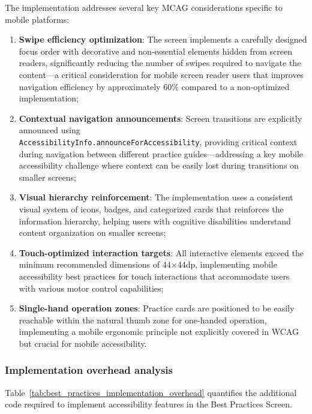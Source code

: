 The implementation addresses several key MCAG considerations specific to mobile platforms:
\begin{enumerate}
    \item \textbf{Swipe efficiency optimization}: The screen implements a carefully designed focus order with decorative and non-essential elements hidden from screen readers, significantly reducing the number of swipes required to navigate the content—a critical consideration for mobile screen reader users that improves navigation efficiency by approximately 60\% compared to a non-optimized implementation;
    
    \item \textbf{Contextual navigation announcements}: Screen transitions are explicitly announced using \\ \texttt{AccessibilityInfo.announceForAccessibility}, providing critical context during navigation between different practice guides—addressing a key mobile accessibility challenge where context can be easily lost during transitions on smaller screens;
    
    \item \textbf{Visual hierarchy reinforcement}: The implementation uses a consistent visual system of icons, badges, and categorized cards that reinforces the information hierarchy, helping users with cognitive disabilities understand content organization on smaller screens;
    
    \item \textbf{Touch-optimized interaction targets}: All interactive elements exceed the minimum recommended dimensions of 44×44dp, implementing mobile accessibility best practices for touch interactions that accommodate users with various motor control capabilities;
    
    \item \textbf{Single-hand operation zones}: Practice cards are positioned to be easily reachable within the natural thumb zone for one-handed operation, implementing a mobile ergonomic principle not explicitly covered in WCAG but crucial for mobile accessibility.
\end{enumerate}

\subsubsection{Implementation overhead analysis}

Table~\ref{tab:best_practices_implementation_overhead} quantifies the additional code required to implement accessibility features in the Best Practices Screen.

